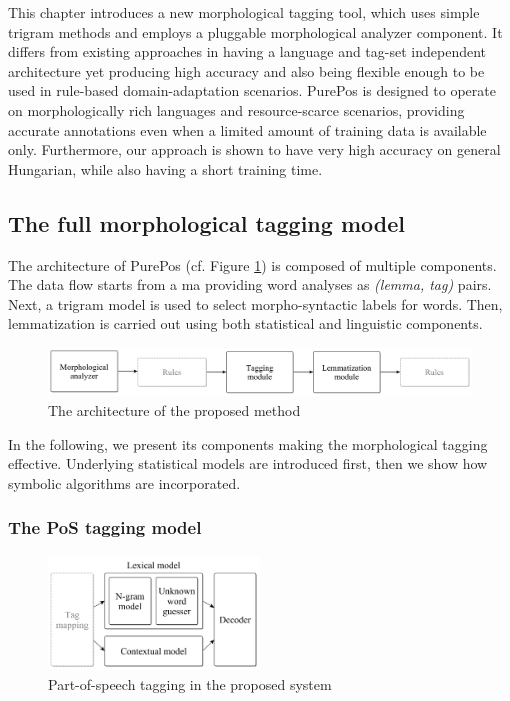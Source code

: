 This chapter introduces a new morphological tagging tool, which uses simple trigram methods and employs a pluggable morphological analyzer component.
It differs from existing approaches in having a language and tag-set independent architecture yet producing high accuracy and also being flexible enough to be used in rule-based domain-adaptation scenarios.
PurePos is designed to operate on morphologically rich languages and resource-scarce scenarios, providing accurate annotations even when a limited amount of training data is available only.
Furthermore, our approach is shown to have very high accuracy on general Hungarian, while also having a short training time.

\subsection{The full morphological tagging model}
\label{sec:purepos}

The architecture of PurePos (cf. Figure \ref{fig:purepos-arch}) is composed of multiple components. 
The data flow starts from a \gls{ma} providing word analyses as \emph{(lemma, tag)} pairs. 
Next, a trigram model is used to select morpho-syntactic labels for words. 
Then, lemmatization is carried out using both statistical and linguistic components. 

\begin{figure}[H]
  \centering
  \includegraphics[width=1\textwidth]{MorphTagging/architecture.png} 
  \caption{The architecture of the proposed method}
  \label{fig:purepos-arch}
\end{figure}

In the following, we present its components making the morphological tagging effective. 
Underlying statistical models are introduced first, then we show how symbolic algorithms are incorporated. 

\subsubsection{The PoS tagging model}

\begin{figure}[H]
  \centering
  \includegraphics[width=0.5\textwidth]{MorphTagging/pos_arch.png} 
  \caption{Part-of-speech tagging in the proposed system}
  \label{fig:pos_arch}
\end{figure}

